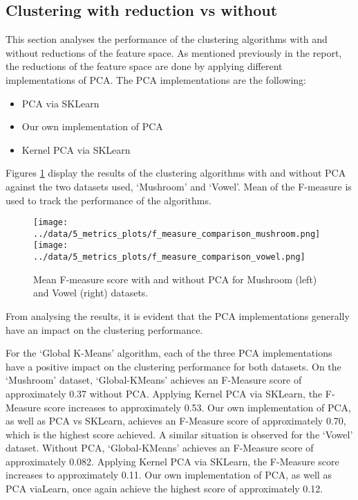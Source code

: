 \subsection{Clustering with reduction vs without}
\label{subsec:clustering-with-reduction-vs-without}

This section analyses the performance of the clustering algorithms with and without reductions of the feature space.
As mentioned previously in the report, the reductions of the feature space are done by applying different
implementations of PCA. The PCA implementations are the following:

\begin{itemize}
    \item PCA via SKLearn
    \item Our own implementation of PCA
    \item Kernel PCA via SKLearn
\end{itemize}

Figures \ref{fig:clustering-results} display the results of the clustering algorithms
with and without PCA against the two datasets used, `Mushroom' and `Vowel'.
Mean of the F-measure is used to track the performance of the algorithms.

\begin{figure}[!h]
    \centering
    \texttt{[image: ../data/5\_metrics\_plots/f\_measure\_comparison\_mushroom.png]}
    \texttt{[image: ../data/5\_metrics\_plots/f\_measure\_comparison\_vowel.png]}
    \caption{Mean F-measure score with and without PCA for Mushroom (left) and Vowel (right) datasets.}
\label{fig:clustering-results}
\end{figure}


From analysing the results, it is evident that the PCA implementations generally have an 
impact on the clustering performance.

For the `Global K-Means' algorithm, each of the three 
PCA implementations have a positive impact on the clustering performance for both datasets.
On the `Mushroom' dataset, `Global-KMeans' achieves an F-Measure score of approximately 0.37
without PCA. Applying Kernel PCA via SKLearn, the F-Measure score increases to approximately 0.53. 
Our own implementation of PCA, as well as PCA vs SKLearn, achieves an F-Measure score of approximately 0.70,
which is the highest score achieved.  
A similar situation is observed for the `Vowel' dataset. Without PCA, `Global-KMeans'
achieves an F-Measure score of approximately 0.082. Applying Kernel PCA via SKLearn,
the F-Measure score increases to approximately 0.11. Our own implementation of PCA,
as well as PCA viaLearn, once again achieve the highest score of approximately 0.12.

